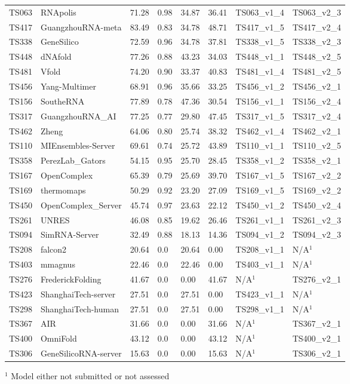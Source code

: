 \begin{table}[ht]
{\begin{tabular}{llllllll}
TS063 & RNApolis & 71.28 & 0.98 & 34.87 & 36.41 & TS063\_v1\_4 & TS063\_v2\_3 \\ 
TS417 & GuangzhouRNA-meta & 83.49 & 0.83 & 34.78 & 48.71 & TS417\_v1\_5 & TS417\_v2\_4 \\ 
TS338 & GeneSilico & 72.59 & 0.96 & 34.78 & 37.81 & TS338\_v1\_5 & TS338\_v2\_3 \\ 
TS448 & dNAfold & 77.26 & 0.88 & 43.23 & 34.03 & TS448\_v1\_1 & TS448\_v2\_5 \\ 
TS481 & Vfold & 74.20 & 0.90 & 33.37 & 40.83 & TS481\_v1\_4 & TS481\_v2\_5 \\ 
TS456 & Yang-Multimer & 68.91 & 0.96 & 35.66 & 33.25 & TS456\_v1\_2 & TS456\_v2\_1 \\ 
TS156 & SoutheRNA & 77.89 & 0.78 & 47.36 & 30.54 & TS156\_v1\_1 & TS156\_v2\_4 \\ 
TS317 & GuangzhouRNA\_AI & 77.25 & 0.77 & 29.80 & 47.45 & TS317\_v1\_5 & TS317\_v2\_4 \\ 
TS462 & Zheng & 64.06 & 0.80 & 25.74 & 38.32 & TS462\_v1\_4 & TS462\_v2\_1 \\ 
TS110 & MIEnsembles-Server & 69.61 & 0.74 & 25.72 & 43.89 & TS110\_v1\_1 & TS110\_v2\_5 \\ 
TS358 & PerezLab\_Gators & 54.15 & 0.95 & 25.70 & 28.45 & TS358\_v1\_2 & TS358\_v2\_1 \\ 
TS167 & OpenComplex & 65.39 & 0.79 & 25.69 & 39.70 & TS167\_v1\_5 & TS167\_v2\_2 \\ 
TS169 & thermomaps & 50.29 & 0.92 & 23.20 & 27.09 & TS169\_v1\_5 & TS169\_v2\_2 \\ 
TS450 & OpenComplex\_Server & 45.74 & 0.97 & 23.63 & 22.12 & TS450\_v1\_2 & TS450\_v2\_4 \\ 
TS261 & UNRES & 46.08 & 0.85 & 19.62 & 26.46 & TS261\_v1\_1 & TS261\_v2\_3 \\ 
TS094 & SimRNA-Server & 32.49 & 0.88 & 18.13 & 14.36 & TS094\_v1\_2 & TS094\_v2\_3 \\ 
TS208 & falcon2 & 20.64 & 0.0 & 20.64 & 0.00 & TS208\_v1\_1 & N/A$^{1}$ \\ 
TS403 & mmagnus & 22.46 & 0.0 & 22.46 & 0.00 & TS403\_v1\_1 & N/A$^{1}$ \\ 
TS276 & FrederickFolding & 41.67 & 0.0 & 0.00 & 41.67 & N/A$^{1}$ & TS276\_v2\_1 \\ 
TS423 & ShanghaiTech-server & 27.51 & 0.0 & 27.51 & 0.00 & TS423\_v1\_1 & N/A$^{1}$ \\ 
TS298 & ShanghaiTech-human & 27.51 & 0.0 & 27.51 & 0.00 & TS298\_v1\_1 & N/A$^{1}$ \\ 
TS367 & AIR & 31.66 & 0.0 & 0.00 & 31.66 & N/A$^{1}$ & TS367\_v2\_1 \\ 
TS400 & OmniFold & 43.12 & 0.0 & 0.00 & 43.12 & N/A$^{1}$ & TS400\_v2\_1 \\ 
TS306 & GeneSilicoRNA-server & 15.63 & 0.0 & 0.00 & 15.63 & N/A$^{1}$ & TS306\_v2\_1 \\ 
\bottomrule
\end{tabular}%
}
\begin{flushleft}\footnotesize $^{1}$ Model either not submitted or not assessed\end{flushleft}
\end{table}
